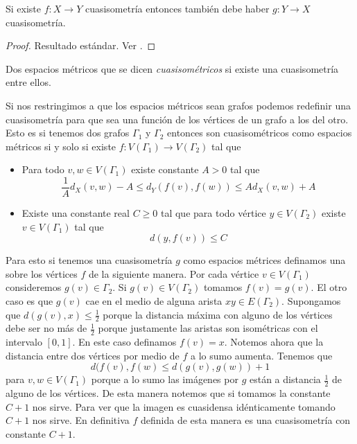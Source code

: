 \documentclass[tesis.tex]{subfiles}
\begin{document}
\begin{prop}
	Si existe $f:X \to Y$ cuasisometría entonces también debe haber $g:Y \to X$ cuasisometría.
\end{prop}
\begin{proof}
	Resultado estándar. Ver \cite{bridson2013metric}.
\end{proof}

\begin{deff}
	Dos espacios métricos que se dicen \emph{cuasisométricos} si existe una cuasisometría entre ellos.
\end{deff}


\begin{obs}
	Si nos restringimos a que los espacios métricos sean grafos podemos redefinir una cuasisometría para que sea una función de los vértices de un grafo a los del otro.
	Esto es si tenemos dos grafos $\Gamma_1$ y $\Gamma_2$ entonces son cuasisométricos como espacios métricos si y solo si existe $f:V(\Gamma_1) \to V(\Gamma_2)$ tal que 
	\begin{itemize}
		\item Para todo $v,w \in V(\Gamma_1)$ existe constante $A > 0$ tal que 
		\[
		\frac{1}{A} d_X(v,w) - A \le d_Y(f(v),f(w)) \le A d_X(v,w) + A
		\]
		\item Existe una constante real $C \ge 0$ tal que para todo vértice $y \in V(\Gamma_2)$ existe $v \in V(\Gamma_1)$ tal que 
		\[
		d(y,f(v)) \le C
		\]
	\end{itemize}
	
	Para esto si tenemos una cuasisometría $g$ como espacios métrices definamos una sobre los vértices $f$ de la siguiente manera.
	Por cada vértice $v \in V(\Gamma_1)$ consideremos $g(v) \in \Gamma_2$. 
	Si $g(v) \in V(\Gamma_2)$ tomamos $f(v)=g(v)$.
	El otro caso es que $g(v)$ cae en el medio de alguna arista $xy \in E(\Gamma_2)$. 
	Supongamos que $d(g(v),x) \le \frac{1}{2}$ porque la distancia máxima con alguno de los vértices debe ser no más de $\frac{1}{2}$ porque justamente las aristas son isométricas con el intervalo $[0,1]$. 
	En este caso definamos $f(v) = x$.
	Notemos ahora que la distancia entre dos vértices por medio de $f$ a lo sumo aumenta. 
	Tenemos que 
	\[
	d(f(v),f(w) \le d (g(v),g(w)) + 1
	\]
	para $v,w \in V(\Gamma_1)$ porque a lo sumo las imágenes por $g$ están a distancia $\frac{1}{2}$ de alguno de los vértices.
	De esta manera notemos que si tomamos la constante $C+1$ nos sirve.
	Para ver que la imagen es cuasidensa idénticamente tomando $C+1$ nos sirve.
	En definitiva $f$ definida de esta manera es una cuasisometría con constante $C+1$.	
\end{obs}
\end{document}
